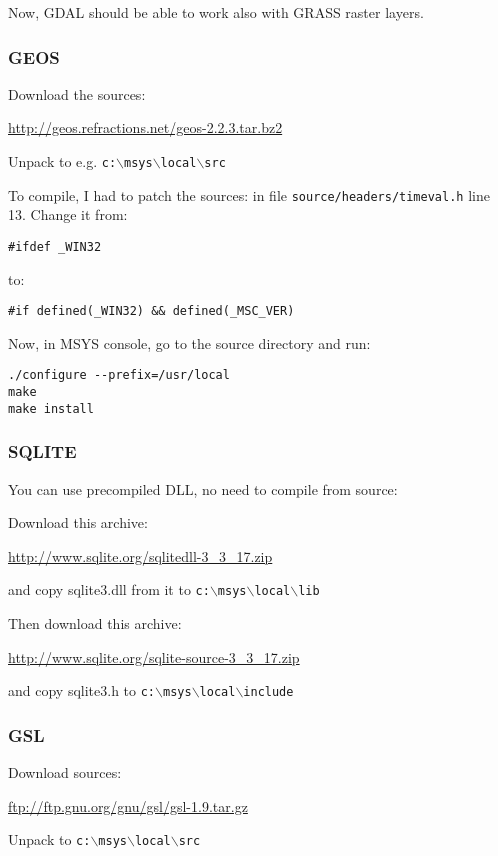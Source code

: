 Now, GDAL should be able to work also with GRASS raster layers.

\subsubsection{GEOS}
Download the sources:

\url{http://geos.refractions.net/geos-2.2.3.tar.bz2}

Unpack to e.g. \texttt{c:$\backslash$msys$\backslash$local$\backslash$src}

To compile, I had to patch the sources: in file \texttt{source/headers/timeval.h} line 13.
Change it from:

\begin{verbatim}
#ifdef _WIN32
\end{verbatim}
to:

\begin{verbatim}
#if defined(_WIN32) && defined(_MSC_VER)
\end{verbatim}

Now, in MSYS console, go to the source directory and run:

\begin{verbatim}
./configure --prefix=/usr/local
make
make install
\end{verbatim}

\subsubsection{SQLITE}
You can use precompiled DLL, no need to compile from source:

Download this archive:


\url{http://www.sqlite.org/sqlitedll-3\_3\_17.zip}

and copy sqlite3.dll from it to \texttt{c:$\backslash$msys$\backslash$local$\backslash$lib}

Then download this archive:

\url{http://www.sqlite.org/sqlite-source-3\_3\_17.zip}

and copy sqlite3.h to \texttt{c:$\backslash$msys$\backslash$local$\backslash$include}

\subsubsection{GSL}
Download sources:

\url{ftp://ftp.gnu.org/gnu/gsl/gsl-1.9.tar.gz}

Unpack to \texttt{c:$\backslash$msys$\backslash$local$\backslash$src}

